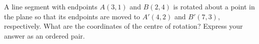 A line segment with endpoints $A(3,1)$ and $B(2,4)$ is rotated about a point in the plane so that its endpoints are moved to $A'(4,2)$ and $B'(7,3)$, respectively. What are the coordinates of the centre of rotation? Express your answer as an ordered pair.
